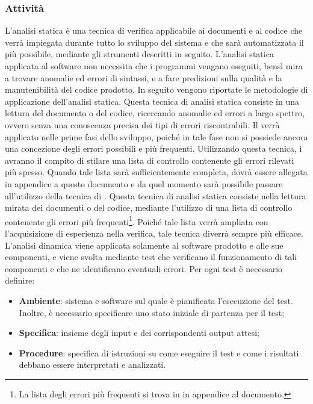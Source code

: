 \subsubsection{Attività}\label{attivitaVerifica}
L'analisi statica è una tecnica di verifica applicabile ai documenti e al codice che verrà impiegata durante tutto lo sviluppo del sistema e che sarà automatizzata il più possibile, mediante gli strumenti descritti in seguito. L'analisi statica applicata al software non necessita che i programmi vengano eseguiti, bensì mira a trovare anomalie ed errori di sintassi, e a fare predizioni sulla qualità e la manutenibilità del codice prodotto. In seguito vengono riportate le metodologie di applicazione dell'analisi statica.
Questa tecnica di analisi statica consiste in una lettura del documento o del codice, ricercando anomalie ed errori a largo spettro, ovvero senza una conoscenza precisa dei tipi di errori riscontrabili. Il  verrà applicato nelle prime fasi dello sviluppo, poiché in tale fase non si possiede ancora una concezione degli errori possibili e più frequenti.
Utilizzando questa tecnica, i \rVs avranno il compito di stilare una lista di controllo contenente gli errori rilevati più spesso. Quando tale lista sarà sufficientemente completa, dovrà essere allegata in appendice a questo documento e da quel momento sarà possibile passare all'utilizzo della tecnica di .
Questa tecnica di analisi statica consiste nella lettura mirata dei documenti o del codice, mediante l'utilizzo di una lista di controllo contenente gli errori più frequenti\footnote{La lista degli errori più frequenti si trova in in appendice al documento.}. Poiché tale lista verrà ampliata con l'acquisizione di esperienza nella verifica, tale tecnica diverrà sempre più efficace.
L'analisi dinamica viene applicata solamente al software prodotto e alle sue componenti, e viene svolta mediante test che verificano il funzionamento di tali componenti e che ne identificano eventuali errori. Per ogni test è necessario definire:
\begin{itemize}
\item \textbf{Ambiente}: sistema  e software sul quale è pianificata l'esecuzione del test. Inoltre, è necessario specificare uno stato iniziale di partenza per il test;
\item \textbf{Specifica}: insieme degli input e dei corrispondenti output attesi;
\item \textbf{Procedure}: specifica di istruzioni su come eseguire il test e come i risultati debbano essere interpretati e analizzati.
\end{itemize}
